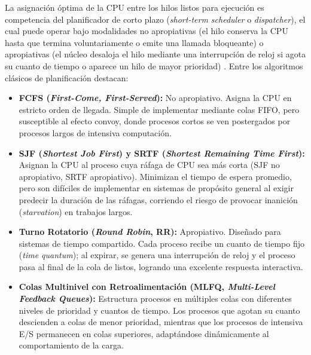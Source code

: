 \documentclass[12pt]{article}
\begin{document}
La asignación óptima de la CPU entre los hilos listos para ejecución es competencia del planificador de corto plazo (\textit{short-term scheduler} o \textit{dispatcher}), el cual puede operar bajo modalidades no apropiativas (el hilo conserva la CPU hasta que termina voluntariamente o emite una llamada bloqueante) o apropiativas (el núcleo desaloja el hilo mediante una interrupción de reloj si agota su cuanto de tiempo o aparece un hilo de mayor prioridad) \parencite[\S 9.2, pp.\ 418--422]{stallings2018operating}. Entre los algoritmos clásicos de planificación destacan:
\begin{itemize}[leftmargin=*]
    \item \textbf{FCFS (\textit{First-Come, First-Served}):} No apropiativo. Asigna la CPU en estricto orden de llegada. Simple de implementar mediante colas FIFO, pero susceptible al efecto convoy, donde procesos cortos se ven postergados por procesos largos de intensiva computación.
    \item \textbf{SJF (\textit{Shortest Job First}) y SRTF (\textit{Shortest Remaining Time First}):} Asignan la CPU al proceso cuya ráfaga de CPU sea más corta (SJF no apropiativo, SRTF apropiativo). Minimizan el tiempo de espera promedio, pero son difíciles de implementar en sistemas de propósito general al exigir predecir la duración de las ráfagas, corriendo el riesgo de provocar inanición (\textit{starvation}) en trabajos largos.
    \item \textbf{Turno Rotatorio (\textit{Round Robin}, RR):} Apropiativo. Diseñado para sistemas de tiempo compartido. Cada proceso recibe un cuanto de tiempo fijo (\textit{time quantum}); al expirar, se genera una interrupción de reloj y el proceso pasa al final de la cola de listos, logrando una excelente respuesta interactiva.
    \item \textbf{Colas Multinivel con Retroalimentación (MLFQ, \textit{Multi-Level Feedback Queues}):} Estructura procesos en múltiples colas con diferentes niveles de prioridad y cuantos de tiempo. Los procesos que agotan su cuanto descienden a colas de menor prioridad, mientras que los procesos de intensiva E/S permanecen en colas superiores, adaptándose dinámicamente al comportamiento de la carga.
\end{itemize}
\end{document}
